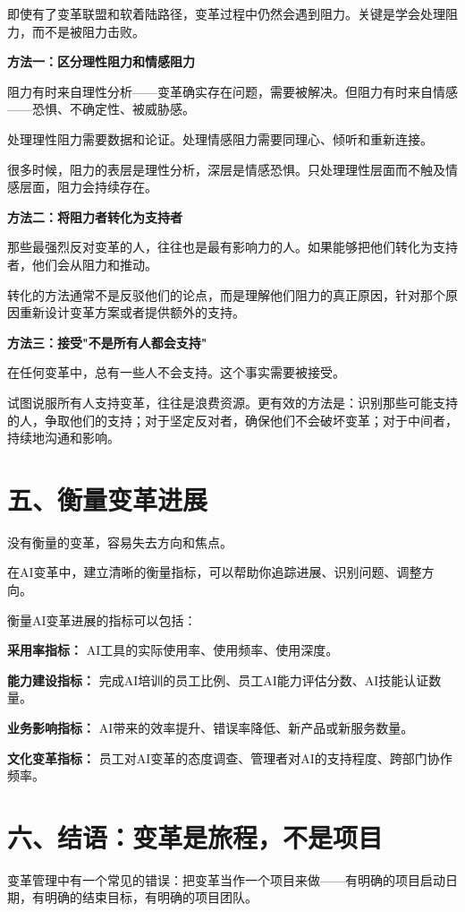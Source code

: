 即使有了变革联盟和软着陆路径，变革过程中仍然会遇到阻力。关键是学会处理阻力，而不是被阻力击败。

\textbf{方法一：区分理性阻力和情感阻力}

阻力有时来自理性分析——变革确实存在问题，需要被解决。但阻力有时来自情感——恐惧、不确定性、被威胁感。

处理理性阻力需要数据和论证。处理情感阻力需要同理心、倾听和重新连接。

很多时候，阻力的表层是理性分析，深层是情感恐惧。只处理理性层面而不触及情感层面，阻力会持续存在。

\textbf{方法二：将阻力者转化为支持者}

那些最强烈反对变革的人，往往也是最有影响力的人。如果能够把他们转化为支持者，他们会从阻力和推动。

转化的方法通常不是反驳他们的论点，而是理解他们阻力的真正原因，针对那个原因重新设计变革方案或者提供额外的支持。

\textbf{方法三：接受"不是所有人都会支持"}

在任何变革中，总有一些人不会支持。这个事实需要被接受。

试图说服所有人支持变革，往往是浪费资源。更有效的方法是：识别那些可能支持的人，争取他们的支持；对于坚定反对者，确保他们不会破坏变革；对于中间者，持续地沟通和影响。

\section{五、衡量变革进展}


没有衡量的变革，容易失去方向和焦点。

在AI变革中，建立清晰的衡量指标，可以帮助你追踪进展、识别问题、调整方向。

衡量AI变革进展的指标可以包括：

\textbf{采用率指标：} AI工具的实际使用率、使用频率、使用深度。

\textbf{能力建设指标：} 完成AI培训的员工比例、员工AI能力评估分数、AI技能认证数量。

\textbf{业务影响指标：} AI带来的效率提升、错误率降低、新产品或新服务数量。

\textbf{文化变革指标：} 员工对AI变革的态度调查、管理者对AI的支持程度、跨部门协作频率。

\section{六、结语：变革是旅程，不是项目}


变革管理中有一个常见的错误：把变革当作一个项目来做——有明确的项目启动日期，有明确的结束目标，有明确的项目团队。

